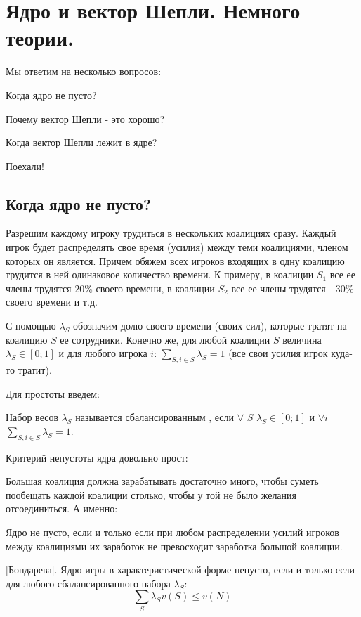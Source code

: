 \section{Ядро и вектор Шепли. Немного теории.}

Мы ответим на несколько вопросов:

Когда ядро не пусто?

Почему вектор Шепли - это хорошо?

Когда вектор Шепли лежит в ядре?

Поехали!

\subsection{Когда ядро не пусто?}

Разрешим каждому игроку трудиться в нескольких коалициях сразу. Каждый игрок будет распределять свое время (усилия) между теми коалициями, членом которых он является. Причем обяжем всех игроков входящих в одну коалицию трудится в ней одинаковое количество времени. К примеру, в коалиции $S_{1}$ все ее члены трудятся 20\% своего времени, в коалиции $S_{2}$ все ее члены трудятся - 30\% своего времени и т.д. 

С помощью $\lambda_{S}$ обозначим долю своего времени (своих сил), которые тратят на коалицию $S$ ее сотрудники. Конечно же, для любой коалиции $S$ величина $\lambda_{S}\in [0;1]$ и для любого игрока $i$: $\sum_{S, i\in S} \lambda_{S}=1$ (все свои усилия игрок куда-то тратит). 

Для простоты введем:
\begin{mydef}
Набор весов $\lambda_{S}$ называется сбалансированным , если $\forall$ $S$ $\lambda_{S}\in[0;1]$ и $\forall i$ $\sum_{S, i\in S} \lambda_{S}=1$.
\end{mydef}

Критерий непустоты ядра довольно прост:

Большая коалиция должна зарабатывать достаточно много, чтобы суметь пообещать каждой коалиции столько, чтобы у той не было желания отсоединиться. А именно:

Ядро не пусто, если и только если при любом распределении усилий игроков между коалициями их заработок не превосходит заработка большой коалиции.

\begin{myth} $[$Бондарева$]$. 
Ядро игры в характеристической форме непусто, если и только если для любого сбалансированного набора $\lambda_{S}$:
\begin{equation}
\sum_{S} \lambda_{S}v(S)\leq v(N)
\end{equation}
\end{myth}


